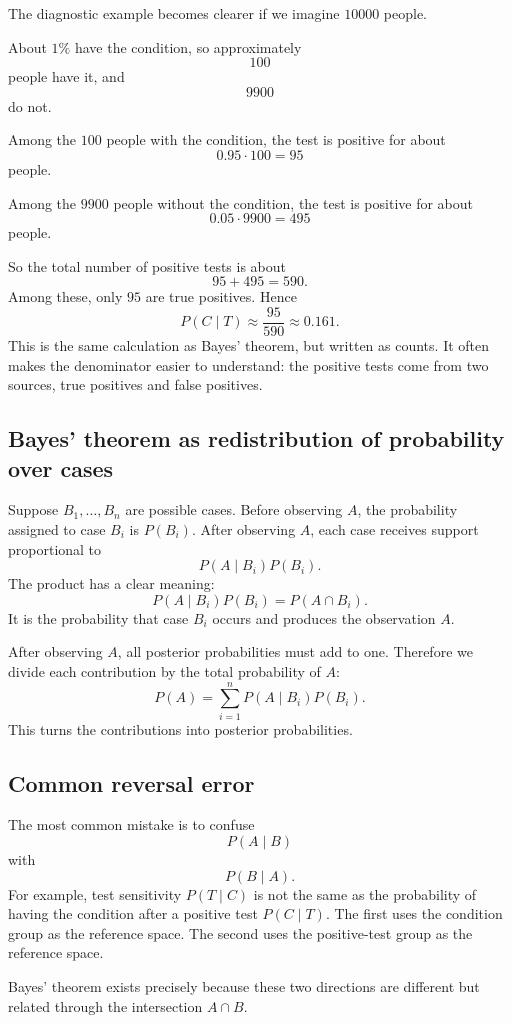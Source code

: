 The diagnostic example becomes clearer if we imagine \(10000\) people.

About \(1\%\) have the condition, so approximately
\[
100
\]
people have it, and
\[
9900
\]
do not.

Among the \(100\) people with the condition, the test is positive for about
\[
0.95\cdot100=95
\]
people.

Among the \(9900\) people without the condition, the test is positive for about
\[
0.05\cdot9900=495
\]
people.

So the total number of positive tests is about
\[
95+495=590.
\]
Among these, only \(95\) are true positives. Hence
\[
P(C\mid T)\approx\frac{95}{590}\approx0.161.
\]
This is the same calculation as Bayes' theorem, but written as counts. It often
makes the denominator easier to understand: the positive tests come from two
sources, true positives and false positives.

\subsection*{Bayes' theorem as redistribution of probability over cases}

Suppose \(B_1,
\ldots,B_n\) are possible cases. Before observing \(A\), the
probability assigned to case \(B_i\) is \(P(B_i)\). After observing \(A\), each
case receives support proportional to
\[
P(A\mid B_i)P(B_i).
\]
The product has a clear meaning:
\[
P(A\mid B_i)P(B_i)=P(A\cap B_i).
\]
It is the probability that case \(B_i\) occurs and produces the observation
\(A\).

After observing \(A\), all posterior probabilities must add to one. Therefore we
divide each contribution by the total probability of \(A\):
\[
P(A)=\sum_{i=1}^n P(A\mid B_i)P(B_i).
\]
This turns the contributions into posterior probabilities.

\subsection*{Common reversal error}

The most common mistake is to confuse
\[
P(A\mid B)
\]
with
\[
P(B\mid A).
\]
For example, test sensitivity \(P(T\mid C)\) is not the same as the probability
of having the condition after a positive test \(P(C\mid T)\). The first uses the
condition group as the reference space. The second uses the positive-test group
as the reference space.

Bayes' theorem exists precisely because these two directions are different but
related through the intersection \(A\cap B\).

